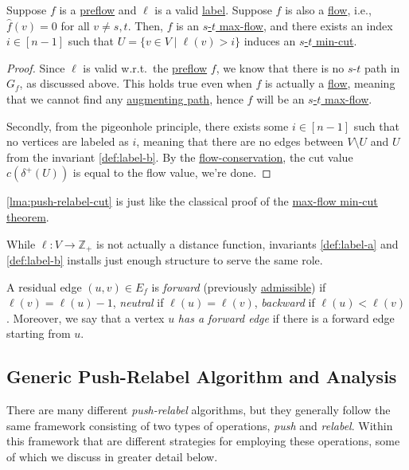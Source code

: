 \begin{lemma}\label{lma:push-relabel-cut}
	Suppose \(f\) is a \hyperref[def:preflow]{preflow} and \(\ell \) is a valid \hyperref[def:label]{label}. Suppose \(f\) is also a \hyperref[def:flow]{flow}, i.e., \(\hat{f} (v) = 0\) for all \(v \neq s, t\). Then, \(f\) is an \hyperref[prb:s-t-max-flow]{\(s\)-\(t\) max-flow}, and there exists an index \(i \in [n-1]\) such that \(U = \{ v \in V \mid \ell (v) > i \} \) induces an \hyperref[prb:s-t-min-cut]{\(s\)-\(t\) min-cut}.
\end{lemma}
\begin{proof}
	Since \(\ell \) is valid w.r.t.\ the \hyperref[def:preflow]{preflow} \(f\), we know that there is no \(s\)-\(t\) path in \(G_f\), as discussed above. This holds true even when \(f\) is actually a \hyperref[def:flow]{flow}, meaning that we cannot find any \hyperref[def:augmenting-path]{augmenting path}, hence \(f\) will be an \hyperref[prb:s-t-max-flow]{\(s\)-\(t\) max-flow}.

	Secondly, from the pigeonhole principle, there exists some \(i \in [n-1]\) such that no vertices are labeled as \(i\), meaning that there are no edges between \(V\setminus U\) and \(U\) from the invariant \autoref{def:label-b}. By the \hyperref[def:flow-conservation]{flow-conservation}, the cut value \(c(\delta ^+(U))\) is equal to the flow value, we're done.
\end{proof}

\begin{remark}
	\autoref{lma:push-relabel-cut} is just like the classical proof of the \hyperref[thm:max-flow-min-cut*]{max-flow min-cut theorem}.
\end{remark}

While \(\ell \colon V \to \mathbb{Z} _{+}\) is not actually a distance function, invariants \autoref{def:label-a} and \autoref{def:label-b} installs just enough structure to serve the same role.

\begin{notation}
	A residual edge \((u, v) \in E_f\) is \emph{forward} (previously \hyperref[def:admissible]{admissible}) if \(\ell (v) = \ell (u) - 1\), \emph{neutral} if \(\ell (u) = \ell (v)\), \emph{backward} if \(\ell (u) < \ell (v)\). Moreover, we say that a vertex \(u\) \emph{has a forward edge} if there is a forward edge starting from \(u\).
\end{notation}

\subsection{Generic Push-Relabel Algorithm and Analysis}
There are many different \emph{push-relabel} algorithms, but they generally follow the same framework consisting of two types of operations, \emph{push} and \emph{relabel}. Within this framework that are different strategies for employing these operations, some of which we discuss in greater detail below.

